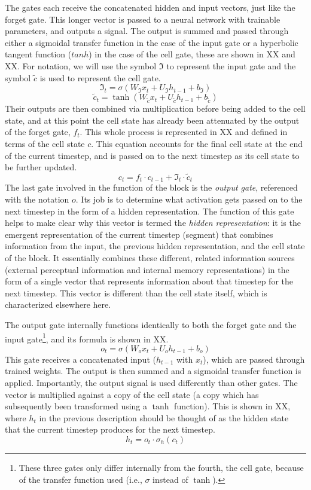 \documentclass[
  american,
  man,floatsintext]{apa6}
\begin{document}
The gates each receive the concatenated hidden and input vectors, just like the forget gate. This longer vector is passed to a neural network with trainable parameters, and outputs a signal. The output is summed and passed through either a sigmoidal transfer function in the case of the input gate or a hyperbolic tangent function (\(tanh\)) in the case of the cell gate, these are shown in XX and XX. For notation, we will use the symbol \(\Im\) to represent the input gate and the symbol \(\tilde{c}\) is used to represent the cell gate.
\[
\Im_t = \sigma(W_{\Im}x_t + U_{\Im}h_{t-1} + b_{\Im})
\]
\[
\tilde{c}_t = \tanh(W_{\tilde{c}}x_t + U_{\tilde{c}}h_{t-1} + b_{\tilde{c}})
\]
Their outputs are then combined via multiplication before being added to the cell state, and at this point the cell state has already been attenuated by the output of the forget gate, \(f_t\). This whole process is represented in XX and defined in terms of the cell state \(c\). This equation accounts for the final cell state at the end of the current timestep, and is passed on to the next timestep as its cell state to be further updated.
\[
c_t = f_t \cdot c_{t-1} + \Im_t \cdot \tilde{c}_t
\]
The last gate involved in the function of the block is the \emph{output gate}, referenced with the notation \(o\). Its job is to determine what activation gets passed on to the next timestep in the form of a hidden representation. The function of this gate helps to make clear why this vector is termed the \emph{hidden representation}: it is the emergent representation of the current timestep (segment) that combines information from the input, the previous hidden representation, and the cell state of the block. It essentially combines these different, related information sources (external perceptual information and internal memory representations) in the form of a single vector that represents information about that timestep for the next timestep. This vector is different than the cell state itself, which is characterized elsewhere here.

The output gate internally functions identically to both the forget gate and the input gate\footnote{These three gates only differ internally from the fourth, the cell gate, because of the transfer function used (i.e., \(\sigma\) instead of \(\tanh\)).}, and its formula is shown in XX.
\[
o_t = \sigma(W_ox_t + U_oh_{t-1} + b_o)
\]
This gate receives a concatenated input (\(h_{t-1}\) with \(x_t\)), which are passed through trained weights. The output is then summed and a sigmoidal transfer function is applied. Importantly, the output signal is used differently than other gates. The vector is multiplied against a copy of the cell state (a copy which has subsequently been transformed using a \(\tanh\) function). This is shown in XX, where \(h_t\) in the previous description should be thought of as the hidden state that the current timestep produces for the next timestep.
\[
h_t = o_t \cdot \sigma_h(c_t)
\]
\end{document}
